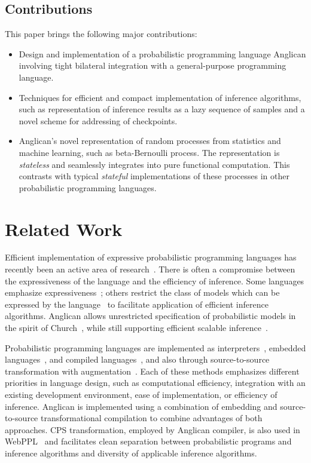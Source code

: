\documentclass[sigconf]{acmart}
\begin{document}
\subsection*{Contributions} This paper brings the following
major contributions:
\begin{itemize}
    \item Design and implementation of a probabilistic programming language
        Anglican involving tight bilateral integration with a general-purpose
        programming language.
    \item Techniques for efficient and compact implementation of inference
        algorithms, such as representation of inference results as a lazy
        sequence of samples and a novel scheme for addressing of checkpoints.
    \item Anglican's novel representation of random processes 
            from statistics and machine learning, such as beta-Bernoulli
            process. The representation is
            \emph{stateless} and seamlessly integrates into pure functional 
            computation. This contrasts with typical \emph{stateful}
            implementations of these processes in other probabilistic 
            programming languages.
\end{itemize}

\section{Related Work} \label{sec:related}

Efficient implementation of expressive probabilistic programming
languages has recently been an active area of
research~\cite{MMR+07,GMR+08,P09,MWG+10,MSP14,
SDT14,WVM14,GS15,GSX+16}. There is often a compromise between
the expressiveness of the language and the efficiency of
inference.  Some languages emphasize
expressiveness~\cite{MMR+07,GMR+08,MSP14,GS15}; others restrict
the class of models which can be expressed by the
language~\cite{MWG+10,SDT14,NN14} to facilitate application of
efficient inference algorithms. Anglican allows unrestricted
specification of probabilistic models in the spirit of
Church~\cite{GMR+08}, while still supporting efficient scalable
inference~\cite{WVM14,PWD+14,RNL+2016}.

Probabilistic programming languages are implemented as
interpreters~\cite{GMR+08,MSP14}, embedded
languages~\cite{P09,SGG15,GSX+16}, and compiled
languages~\cite{MMR+07,SDT14}, and also through source-to-source
transformation with augmentation~\cite{WSG11,GS15}. Each of
these methods emphasizes different priorities in language
design, such as computational efficiency, integration with an
existing development environment, ease of implementation, or
efficiency of inference. Anglican is implemented using a
combination of embedding and source-to-source transformational
compilation to combine advantages of both approaches.  CPS
transformation, employed by Anglican compiler, is also used in
WebPPL~\cite{GS15} and facilitates clean separation between
probabilistic programs and inference algorithms and diversity of
applicable inference algorithms.
\end{document}
